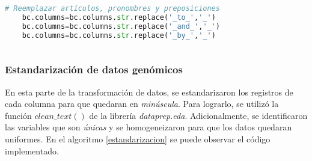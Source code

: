 \begin{lstlisting}[basicstyle=\scriptsize,language=Python, label=renombramiento, caption=Renombramiento de columnas en Python.]
	# Reemplazar artículos, pronombres y preposiciones
	bc.columns=bc.columns.str.replace('_to_','_')
	bc.columns=bc.columns.str.replace('_and_','_')
	bc.columns=bc.columns.str.replace('_by_','_')
	
\end{lstlisting}

\subsubsection{Estandarización de datos genómicos}
En esta parte de la transformación de datos, se estandarizaron los registros de cada columna para que quedaran en \textit{minúscula}. Para lograrlo, se utilizó la función $clean\_text()$ de la librería \textit{dataprep.eda}. Adicionalmente, se identificaron las variables que son \textit{únicas} y se homogeneizaron para que los datos quedaran uniformes. En el algoritmo \ref{estandarizacion} se puede observar el código implementado.

